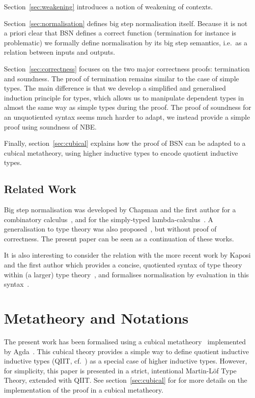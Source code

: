 \documentclass[a4paper,english]{lipics-v2019}
\begin{document}
Section~\ref{sec:weakening} introduces a notion of weakening of contexts.

Section~\ref{sec:normalisation} defines big step normalisation itself. Because
it is not a priori clear that BSN defines a correct function (termination for
instance is problematic) we formally define normalisation by its big step
semantics, i.e.\ as a relation between inputs and outputs.

Section~\ref{sec:correctness} focuses on the two major correctness proofs:
termination and soundness. The proof of termination remains similar to the case
of simple types. The main difference is that we develop a simplified and
generalised induction principle for types, which allows us to manipulate
dependent types in almost the same way as simple types during the proof.
The proof of soundness for an unquotiented syntax seems much harder to
adapt, we instead provide a simple proof using soundness of NBE.

Finally, section~\ref{sec:cubical} explains how the proof of BSN can be
adapted to a cubical metatheory, using higher inductive types to encode
quotient inductive types.

\subsection{Related Work}
Big step normalisation was developed by Chapman and the first author for a
combinatory calculus~\cite{chapman2006tait}, and for the simply-typed
lambda-calculus~\cite{chapman2009bsn}. A generalisation to type theory was
also proposed~\cite{chapman2009type}, but without proof of correctness.
The present paper can be seen as a continuation of these works.

It is also interesting to consider the relation with the more recent work by
Kaposi and the first author which provides a concise, quotiented syntax of
type theory within (a larger) type theory~\cite{kaposi2016type}, and formalises
normalisation by evaluation in this syntax~\cite{kaposi2016normalisation}.

\section{Metatheory and Notations}
\label{sec:theory}
The present work has been formalised using a cubical metatheory~\cite{cchm}
implemented by Agda~\cite{norell2007agda}. This cubical theory provides a simple
way to define quotient inductive inductive types (QIIT, cf.~\cite{kaposi2016type})
as a special case of higher inductive types. However, for simplicity, this paper
is presented in a strict, intentional Martin-Löf Type Theory, extended with
QIIT. See section~\ref{sec:cubical} for for more details on the implementation
of the proof in a cubical metatheory.
\end{document}
